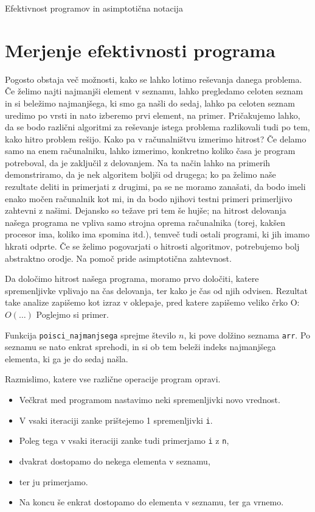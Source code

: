 
Efektivnost programov in asimptotična notacija

\section{Merjenje efektivnosti programa}

Pogosto obstaja več možnosti, kako se lahko lotimo reševanja danega problema.
Če želimo najti najmanjši element v seznamu, lahko pregledamo celoten seznam in
si beležimo najmanjšega, ki smo ga našli do sedaj, lahko pa celoten seznam
uredimo po vrsti in nato izberemo prvi element, na primer.
Pričakujemo lahko, da se bodo različni algoritmi za reševanje istega problema
razlikovali tudi po tem, kako hitro problem rešijo.
Kako pa v računalništvu izmerimo hitrost? Če delamo samo na enem računalniku,
lahko izmerimo, konkretno koliko časa je program potreboval, da je zaključil
z delovanjem. Na ta način lahko na primerih demonstriramo, da je nek algoritem
boljši od drugega; ko pa želimo naše rezultate deliti in primerjati z drugimi,
pa se ne moramo zanašati, da bodo imeli enako močen računalnik kot mi, in da
bodo njihovi testni primeri primerljivo zahtevni z našimi. Dejansko so težave
pri tem še hujše; na hitrost delovanja našega programa ne vpliva samo strojna
oprema računalnika (torej, kakšen procesor ima, koliko ima spomina itd.), temveč
tudi ostali programi, ki jih imamo hkrati odprte.
Če se želimo pogovarjati o hitrosti algoritmov, potrebujemo bolj abstraktno
orodje. Na pomoč pride asimptotična zahtevnost.

Da določimo hitrost našega programa, moramo prvo določiti, katere spremenljivke
vplivajo na čas delovanja, ter kako je čas od njih odvisen.
Rezultat take analize zapišemo kot izraz v oklepaje, pred katere zapišemo
veliko črko O: \(O(\ldots)\)
Poglejmo si primer.


Funkcija \verb+poisci_najmanjsega+ sprejme število \(n\), ki pove dolžino seznama
\verb+arr+. Po seznamu se nato enkrat sprehodi, in si ob tem beleži indeks
najmanjšega elementa, ki ga je do sedaj našla.

Razmislimo, katere vse različne operacije program opravi.
\begin{itemize}
  \item 
	Večkrat med programom nastavimo neki spremenljivki novo vrednost.
  \item
	V vsaki iteraciji zanke prištejemo 1 spremenljivki \verb+i+.
  \item
	Poleg tega v vsaki iteraciji zanke tudi primerjamo \verb+i+ z \verb+n+,
  \item
	dvakrat dostopamo do nekega elementa v seznamu,
  \item
	ter ju primerjamo.
  \item
	Na koncu še enkrat dostopamo do elementa v seznamu, ter ga vrnemo.
\end{itemize}

